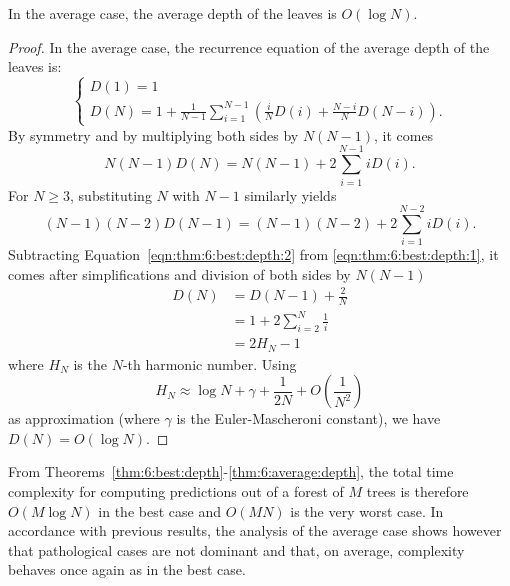\begin{theorem}\label{thm:6:average:depth}
In the average case, the average depth of the leaves is $O(\log N)$.
\end{theorem}

\begin{proof}
In the average case, the recurrence equation of the average depth of the leaves is:
\begin{equation}
\begin{cases}
D(1) = 1 \\
D(N) = 1 + \frac{1}{N-1} \sum_{i=1}^{N-1} (\frac{i}{N} D(i) + \frac{N-i}{N} D(N-i)).
\end{cases}
\end{equation}
By symmetry and by multiplying both sides by $N(N-1)$, it comes
\begin{equation}\label{eqn:thm:6:best:depth:1}
N(N-1) D(N) = N(N-1) + 2 \sum_{i=1}^{N-1} i D(i).
\end{equation}
For $N\geq3$, substituting $N$ with $N-1$ similarly yields
\begin{equation}\label{eqn:thm:6:best:depth:2}
(N-1)(N-2) D(N-1) = (N-1)(N-2) + 2 \sum_{i=1}^{N-2} i D(i).
\end{equation}
Subtracting Equation~\ref{eqn:thm:6:best:depth:2} from \ref{eqn:thm:6:best:depth:1},
it comes after simplifications and division of both sides by $N(N-1)$
\begin{align}
D(N) &= D(N-1) + \frac{2}{N} \nonumber \\
    &= 1 + 2 \sum_{i=2}^N \frac{1}{i} \nonumber \\
    &= 2H_N - 1
\end{align}
where $H_N$ is the $N$-th harmonic number. Using
\begin{equation}
H_N \approx \log N + \gamma + \frac{1}{2N} + O(\frac{1}{N^2})
\end{equation}
as approximation (where $\gamma$ is the Euler-Mascheroni constant), we have $D(N) = O(\log N)$.
\end{proof}

From Theorems~\ref{thm:6:best:depth}-\ref{thm:6:average:depth}, the total time
complexity for computing predictions out of a forest of $M$ trees is therefore
$O(M\log N)$ in the best case and $O(MN)$ is the very worst case. In accordance
with previous results, the analysis of the average case shows however that
pathological cases are not dominant and that, on average, complexity behaves
once again as in the best case.


